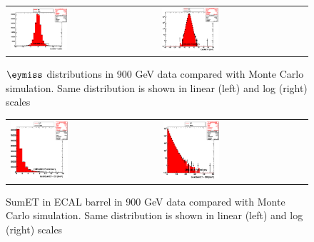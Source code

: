 \begin{figure}[h!]
 \centering
 \begin{tabular}{ll}
  \includegraphics[width=0.40\textwidth]{plots_DataVsMC_MB_900GeV/h_calometPy_lin.eps} &
  \includegraphics[width=0.40\textwidth]{plots_DataVsMC_MB_900GeV/h_calometPy.eps} \\
 \end{tabular}
 \caption{$\eymiss$ distributions in 900 GeV data compared
   with Monte Carlo simulation. Same distribution is shown in linear (left) and log (right) scales
          \label{fig:DataVsMC_MB_900_4}}
\end{figure}

\begin{figure}[h!]
 \centering
 \begin{tabular}{ll}
  \includegraphics[width=0.40\textwidth]{plots_DataVsMC_MB_900GeV/h_caloSumetEB_lin.eps} &
  \includegraphics[width=0.40\textwidth]{plots_DataVsMC_MB_900GeV/h_caloSumetEB.eps} \\
 \end{tabular}
 \caption{SumET in ECAL barrel in 900 GeV data compared
   with Monte Carlo simulation. Same distribution is shown in linear (left) and log (right) scales
          \label{fig:DataVsMC_MB_900_5}}
\end{figure}

